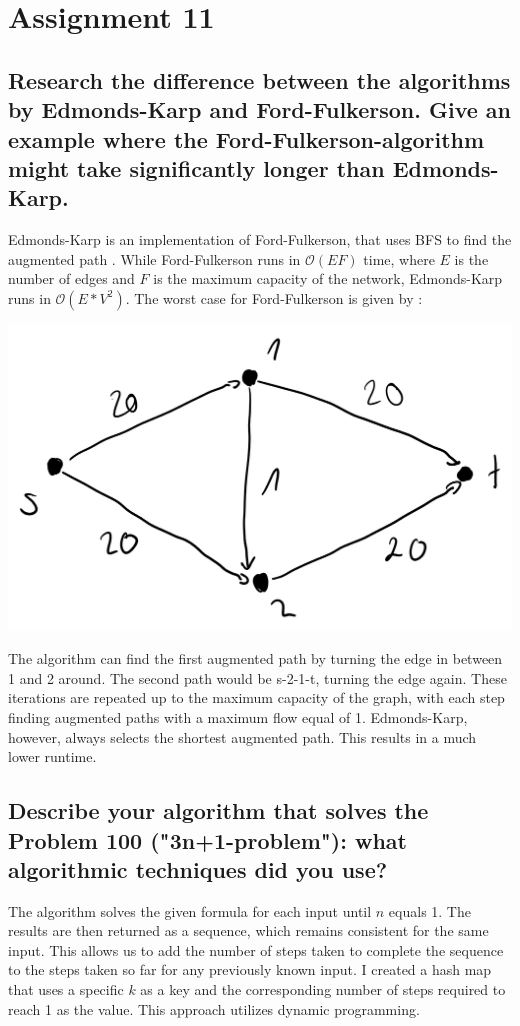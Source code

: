 \documentclass[runningheads]{llncs}
\begin{document}
\section*{Assignment 11}

\subsection*{Research the difference between the algorithms by Edmonds-Karp and Ford-Fulkerson. Give an example where the Ford-Fulkerson-algorithm might take significantly longer than Edmonds-Karp.}
Edmonds-Karp is an implementation of Ford-Fulkerson, that uses BFS to find the augmented path \cite{ref_EK_FF_relation}. While Ford-Fulkerson runs in $\mathcal{O}(EF)$ time, where $E$ is the number of edges and $F$ is the maximum capacity of the network, Edmonds-Karp runs in $\mathcal{O}(E*V^2)$.
The worst case for Ford-Fulkerson is given by \cite{ref_FF_worst_case}:

\includegraphics[scale=0.5]{./resources/graph_5}

The algorithm can find the first augmented path by turning the edge in between 1 and 2 around. The second path would be s-2-1-t, turning the edge again. These iterations are repeated up to the maximum capacity of the graph, with each step finding augmented paths with a maximum flow equal of 1.
Edmonds-Karp, however, always selects the shortest augmented path. This results in a much lower runtime.

\subsection*{Describe your algorithm that solves the Problem 100 ("3n+1-problem"): what algorithmic techniques did you use?}
The algorithm solves the given formula for each input until $n$ equals 1. The results are then returned as a sequence, which remains consistent for the same input. This allows us to add the number of steps taken to complete the sequence to the steps taken so far for any previously known input.
I created a hash map that uses a specific $k$ as a key and the corresponding number of steps required to reach 1 as the value. This approach utilizes dynamic programming.
\end{document}
